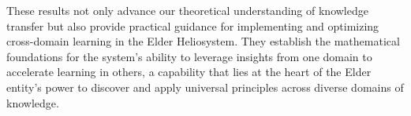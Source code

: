 These results not only advance our theoretical understanding of knowledge transfer but also provide practical guidance for implementing and optimizing cross-domain learning in the Elder Heliosystem. They establish the mathematical foundations for the system's ability to leverage insights from one domain to accelerate learning in others, a capability that lies at the heart of the Elder entity's power to discover and apply universal principles across diverse domains of knowledge.